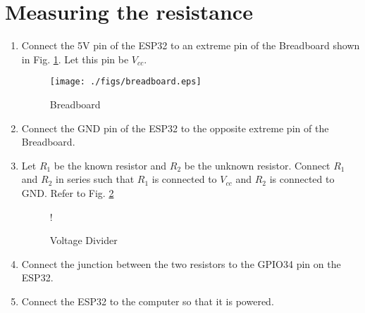 \documentclass[journal,12pt,twocolumn]{IEEEtran}
\renewcommand\thesection{\arabic{section}}
\begin{document}
\section{Measuring the resistance}
\begin{enumerate}[label=\thesection.\arabic*.,ref=\thesection.\theenumi]

\item
Connect the 5V pin of the ESP32 to an extreme pin of the Breadboard shown in Fig. \ref{fig:breadboard}.  Let this pin be $V_{cc}$.

%
%
\begin{figure}
\centering
\texttt{[image: ./figs/breadboard.eps]}
\caption{Breadboard}
\label{fig:breadboard}
\end{figure}
%
\item
Connect the GND pin of the ESP32 to the opposite extreme pin of the Breadboard.

%
%
\item
Let $R_1$ be the known resistor and $R_2$ be the unknown resistor.  Connect $R_1$ and $R_2$ in series such that $R_1$ is connected
to $V_{cc}$ and $R_2$ is connected to GND. Refer to Fig. \ref{fig:voltage_divider}

%
%
\begin{figure}
\centering
\resizebox {\columnwidth} {!} {
%

}
%
\caption{Voltage Divider}
\label{fig:voltage_divider}
\end{figure}
%
\item
Connect the junction between the two resistors to  the GPIO34 pin on the ESP32.

%
\item
Connect the ESP32 to the computer so that it is powered.
%
%


\end{enumerate}
\end{document}
